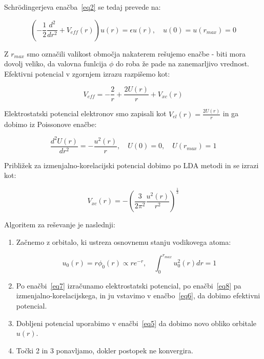 \documentclass[a4paper]{article}
\newcommand{\ddr}[2]{\frac{d^2#1}{d#2^2}}
\newcommand{\half}{\frac{1}{2}}
\begin{document}
    Schr\"odingerjeva enačba~\ref{eq2} se tedaj prevede na:

    \begin{equation}\label{eq5}
        \left( -\half \ddr{}{r} + V_{eff}(r) \right) u(r) = \epsilon u(r), \quad u(0) = u(r_{max}) = 0
    \end{equation}

    Z $r_{max}$ smo označili valikost območja nakaterem rešujemo enačbe - biti mora dovolj veliko, da valovna funlcija
    $\phi$ do roba že pade na zanemarljivo vrednost.
    Efektivni potencial v zgornjem izrazu razpišemo kot:

    \begin{equation}\label{eq6}
        V_{eff} = -\frac{2}{r} + \frac{2U(r)}{r} + V_{xc}(r)
    \end{equation}

    Elektrostatski potencial elektronov smo zapisali kot $V_{el}(r) = \frac{2U(r)}{r}$ in ga dobimo iz Poissonove
    enačbe:

    \begin{equation}\label{eq7}
        \ddr{U(r)}{r} = - \frac{u^2(r)}{r}, \quad U(0) = 0, \quad U(r_{max}) = 1
    \end{equation}

    Približek za izmenjalno-korelacijski potencial dobimo po LDA metodi in se izrazi kot:

    \begin{equation}\label{eq8}
        V_{xc}(r) = - \left( \frac{3}{2\pi^2} \frac{u^2(r)}{r^2} \right)^{\frac{1}{3}}
    \end{equation}

    Algoritem za reševanje je naslednji:

    \begin{enumerate}
        \item Začnemo z orbitalo, ki ustreza osnovnemu stanju vodikovega atoma:

        \begin{equation}\label{eq9}
            u_0(r) = r\phi_0(r) \propto re^{-r}, \quad \int_0^{r_{max}} u_0^2(r)dr = 1
        \end{equation}

        \item Po enačbi~\ref{eq7} izračunamo elektrostatski potencial, po enačbi~\ref{eq8} pa
        izmenjalno-korelacijskega, in ju vstavimo v enačbo~\ref{eq6}, da dobimo efektivni potencial.

        \item Dobljeni potencial uporabimo v enačbi~\ref{eq5} da dobimo novo obliko orbitale $u(r)$.

        \item Točki 2 in 3 ponavljamo, dokler postopek ne konvergira.

    \end{enumerate}
\end{document}

